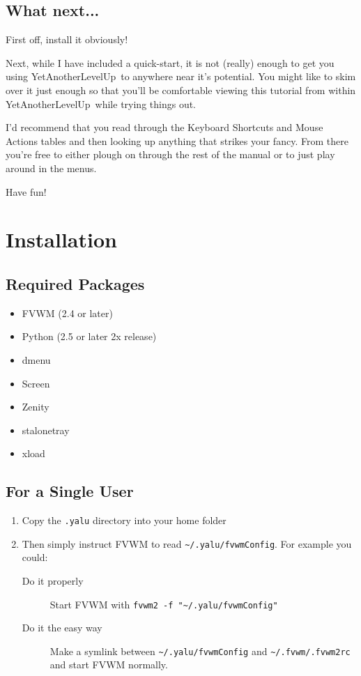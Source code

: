 \documentclass[a4paper,11pt]{article}
\newcommand{\yalu}{YetAnotherLevelUp}
\begin{document}
		\subsection{What next...}
			First off, install it obviously!
			
			Next, while I have included a quick-start, it is not (really) enough to
			get you using \yalu\ to anywhere near it's potential. You might like to
			skim over it just enough so that you'll be comfortable viewing this
			tutorial from within \yalu\ while trying things out.
			
			I'd recommend that you read through the Keyboard Shortcuts and Mouse
			Actions tables and then looking up anything that strikes your fancy. From
			there you're free to either plough on through the rest of the manual or to
			just play around in the menus.
			
			Have fun!
	
	\section{Installation}
		\subsection{Required Packages}
			\begin{itemize}
				\item FVWM (2.4 or later)
				\item Python (2.5 or later 2x release)
				\item dmenu
				\item Screen
				\item Zenity
				\item stalonetray
				\item xload
			\end{itemize}
		
		\subsection{For a Single User}
			\begin{enumerate}
				\item Copy the \texttt{.yalu} directory into your home folder
				\item Then simply instruct FVWM to read \texttt{\textasciitilde/.yalu/fvwmConfig}. For
					example you could:
					\begin{description}
						\item[Do it properly\texttrademark] Start FVWM with
							\texttt{fvwm2 -f "\textasciitilde/.yalu/fvwmConfig"}
						\item[Do it the easy way] Make a symlink between
							\texttt{\textasciitilde/.yalu/fvwmConfig} and
							\texttt{\textasciitilde/.fvwm/.fvwm2rc} and start FVWM normally.
					\end{description}
			\end{enumerate}
\end{document}
